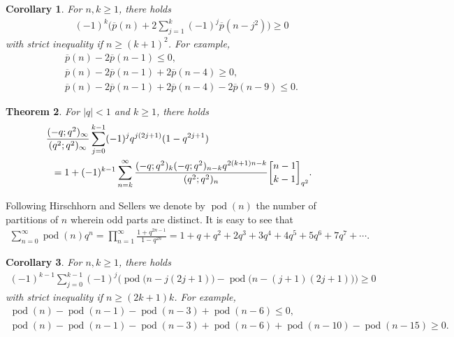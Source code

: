 \documentclass[12pt]{article}
\newtheorem{thm}{Theorem}[section]
\newtheorem{cor}[thm]{Corollary}
\theoremstyle{remark}
\DeclareMathOperator{\podd}{pod}
\numberwithin{equation}{section}
\begin{document}
\begin{cor}\label{cor:2} For $n,k\geqslant 1$, there holds
\begin{align}
(-1)^k \bigg(\overline{p}(n)+2\sum_{j=1}^k (-1)^{j}\overline{p}(n-j^2) \bigg)\geqslant 0  \label{eq:neq-overp}
\end{align}
with strict inequality if $n\geqslant (k+1)^2$. For example,
\begin{align}
\overline {p}(n)-2\overline {p}(n-1)\leqslant 0,  \label{eq:neq-overp2} \\
\overline {p}(n)-2\overline {p}(n-1)+2\overline {p}(n-4)\geqslant 0, \nonumber \\
\overline {p}(n)-2\overline {p}(n-1)+2\overline {p}(n-4)-2\overline {p}(n-9)\leqslant 0. \nonumber
\end{align}
\end{cor}

\begin{thm}\label{thm:3}
For $|q|<1$ and $k\geqslant 1$, there holds
\begin{align*}
&\hskip -2mm \frac{(-q;q^2)_\infty}{(q^2;q^2)_\infty}
\sum_{j=0}^{k-1}(-1)^jq^{j(2j+1)}(1-q^{2j+1}) \nonumber\\
&=1+(-1)^{k-1} \sum_{n=k}^\infty \frac{(-q;q^2)_{k} (-q;q^2)_{n-k}q^{2(k+1)n-k}}
{(q^2;q^2)_n}{n-1\brack k-1}_{q^2}.
\end{align*}
\end{thm}
Following Hirschhorn and Sellers \cite{HS} we  denote by
$\podd (n)$ the number of partitions of $n$ wherein odd
parts are distinct.
It is easy to see that
\begin{align*}
\sum_{n=0}^{\infty}\podd (n) q^n
=\prod_{n=1}^\infty \frac{1+q^{2n-1}}{1-q^{2n}}
=1+q+q^2+2q^3+3q^4+4q^5+5q^6+7q^7+\cdots.
\end{align*}

\begin{cor}\label{cor:4} For $n,k\geqslant 1$, there holds
\begin{align}
(-1)^{k-1}\sum_{j=0}^{k-1} (-1)^{j}\Big(\podd\big(n-j(2j+1)\big)-\podd\big(n-(j+1)(2j+1)\big)\Big)
\geqslant 0  \label{eq:poddneq}
\end{align}
with strict inequality if $n\geqslant (2k+1)k$. For example,
\begin{align*}
\podd (n)-\podd (n-1)-\podd (n-3)+\podd (n-6)\leqslant 0,  \\
\podd (n)-\podd (n-1)-\podd (n-3)+\podd (n-6)+\podd (n-10)-\podd (n-15)\geqslant 0.
\end{align*}
\end{cor}
\end{document}
